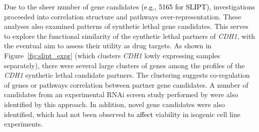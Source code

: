 Due to the sheer number of gene candidates \textcolor{black}{(e.g., 5165 for SLIPT)}, investigations proceeded into correlation structure and \glspl{pathway} over-represent\-ation. These analyses also examined  patterns of \gls{synthetic lethal} gene candidates. This serves to explore the functional similarity of the \gls{synthetic lethal} partners of \textit{CDH1}, with the eventual aim to assess their utility as drug targets. As shown in Figure~\ref{fig:slipt_expr} (which clusters \textit{CDH1} lowly expressing samples separately), there were several large clusters of genes among the   profiles of the \textit{CDH1} \gls{synthetic lethal} candidate partners. The clustering suggests co-regulation of genes or \glspl{pathway} correlation between partner gene candidates. A number of candidates from an experimental \gls{RNAi} screen study performed by \citet{Telford2015} were also identified by this approach. In addition, novel gene candidates were also identified, which had not been observed \textcolor{black}{to affect} viability in isogenic cell line experiments. %

